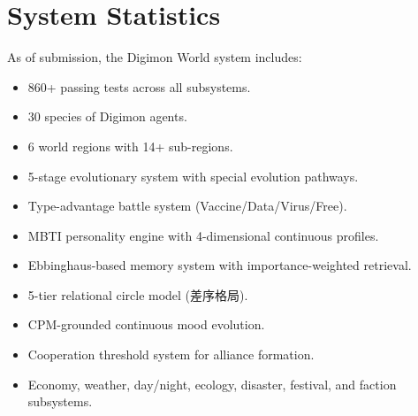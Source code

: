 \documentclass[11pt]{article}
\begin{document}
\section{System Statistics}

As of submission, the Digimon World system includes:
\begin{itemize}[leftmargin=*,nosep]
    \item 860+ passing tests across all subsystems.
    \item 30 species of Digimon agents.
    \item 6 world regions with 14+ sub-regions.
    \item 5-stage evolutionary system with special evolution pathways.
    \item Type-advantage battle system (Vaccine/Data/Virus/Free).
    \item MBTI personality engine with 4-dimensional continuous profiles.
    \item Ebbinghaus-based memory system with importance-weighted retrieval.
    \item 5-tier relational circle model (差序格局).
    \item CPM-grounded continuous mood evolution.
    \item Cooperation threshold system for alliance formation.
    \item Economy, weather, day/night, ecology, disaster, festival, and faction subsystems.
\end{itemize}
\end{document}
